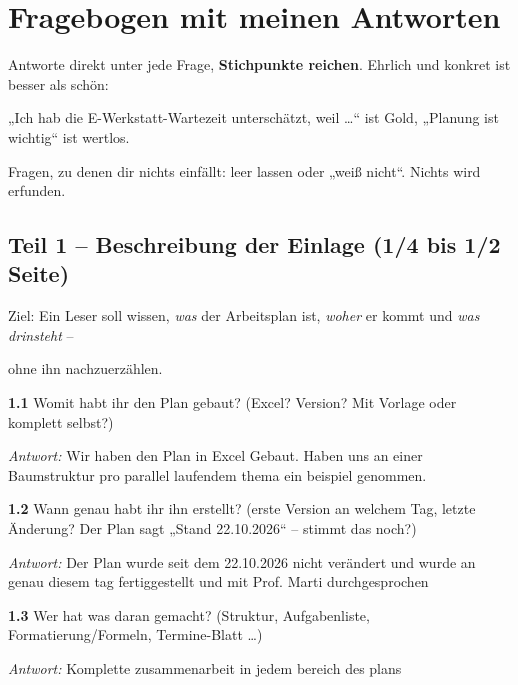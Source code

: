 \section*{Fragebogen mit meinen Antworten}
{\small\raggedright

\par\noindent Antworte direkt unter jede Frage, \textbf{Stichpunkte reichen}. Ehrlich und konkret ist besser als schön:\par
\par\noindent „Ich hab die E-Werkstatt-Wartezeit unterschätzt, weil …“ ist Gold, „Planung ist wichtig“ ist wertlos.\par
\par\noindent Fragen, zu denen dir nichts einfällt: leer lassen oder „weiß nicht“. Nichts wird erfunden.\par
\subsection*{Teil 1 – Beschreibung der Einlage (1/4 bis 1/2 Seite)}
\par\noindent Ziel: Ein Leser soll wissen, \emph{was} der Arbeitsplan ist, \emph{woher} er kommt und \emph{was drinsteht} –\par
\par\noindent ohne ihn nachzuerzählen.\par
\par\noindent \textbf{1.1} Womit habt ihr den Plan gebaut? (Excel? Version? Mit Vorlage oder komplett selbst?)\par
\par\noindent\emph{Antwort:} Wir haben den Plan in Excel Gebaut. Haben uns an einer Baumstruktur pro parallel laufendem thema ein beispiel genommen.\par\smallskip
\par\noindent \textbf{1.2} Wann genau habt ihr ihn erstellt? (erste Version an welchem Tag, letzte Änderung? Der Plan sagt „Stand 22.10.2026“ – stimmt das noch?)\par
\par\noindent\emph{Antwort:} Der Plan wurde seit dem 22.10.2026 nicht verändert und wurde an genau diesem tag fertiggestellt und mit Prof. Marti durchgesprochen\par\smallskip
\par\noindent \textbf{1.3} Wer hat was daran gemacht? (Struktur, Aufgabenliste, Formatierung/Formeln, Termine-Blatt …)\par
\par\noindent\emph{Antwort:} Komplette zusammenarbeit in jedem bereich des plans\par\smallskip
}
